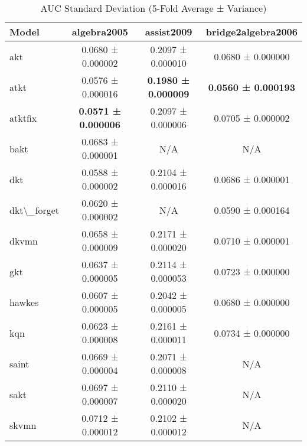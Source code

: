 \begin{table}[H]
\centering
\caption{AUC Standard Deviation (5-Fold Average ± Variance)}
\label{tab:auc_std}
\begin{tabular}{lccc}
\toprule
Model & algebra2005 & assist2009 & bridge2algebra2006 \\
\midrule
akt & 0.0680 ± 0.000002 & 0.2097 ± 0.000010 & 0.0680 ± 0.000000 \\
atkt & 0.0576 ± 0.000016 & \textbf{0.1980 ± 0.000009} & \textbf{0.0560 ± 0.000193} \\
atktfix & \textbf{0.0571 ± 0.000006} & 0.2097 ± 0.000006 & 0.0705 ± 0.000002 \\
bakt & 0.0683 ± 0.000001 & N/A & N/A \\
dkt & 0.0588 ± 0.000002 & 0.2104 ± 0.000016 & 0.0686 ± 0.000001 \\
dkt\textbackslash{}_forget & 0.0620 ± 0.000002 & N/A & 0.0590 ± 0.000164 \\
dkvmn & 0.0658 ± 0.000009 & 0.2171 ± 0.000020 & 0.0710 ± 0.000001 \\
gkt & 0.0637 ± 0.000005 & 0.2114 ± 0.000053 & 0.0723 ± 0.000000 \\
hawkes & 0.0607 ± 0.000005 & 0.2042 ± 0.000005 & 0.0680 ± 0.000000 \\
kqn & 0.0623 ± 0.000008 & 0.2161 ± 0.000011 & 0.0734 ± 0.000000 \\
saint & 0.0669 ± 0.000004 & 0.2071 ± 0.000008 & N/A \\
sakt & 0.0697 ± 0.000007 & 0.2110 ± 0.000020 & N/A \\
skvmn & 0.0712 ± 0.000012 & 0.2102 ± 0.000012 & N/A \\
\bottomrule
\end{tabular}
\end{table}